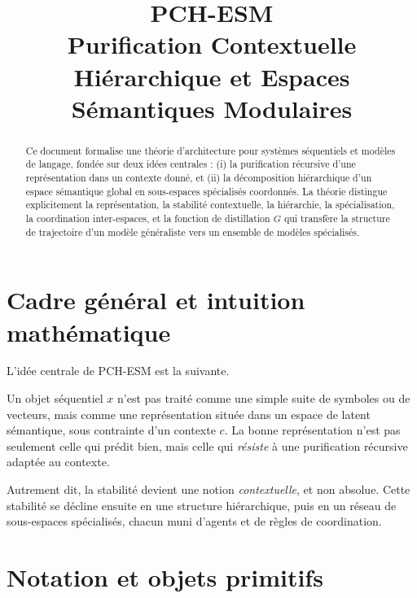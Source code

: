 \documentclass[11pt,a4paper]{article}
\title{PCH-ESM\\
\large Purification Contextuelle Hiérarchique et Espaces Sémantiques Modulaires}
\author{}
\date{}
\newcommand{\1}{\mathbf 1}
\begin{document}
\maketitle

\begin{abstract}
Ce document formalise une théorie d'architecture pour systèmes séquentiels et modèles de langage, fondée sur deux idées centrales :
(i) la purification récursive d'une représentation dans un contexte donné, et
(ii) la décomposition hiérarchique d'un espace sémantique global en sous-espaces spécialisés coordonnés.
La théorie distingue explicitement la représentation, la stabilité contextuelle, la hiérarchie, la spécialisation, la coordination inter-espaces, et la fonction de distillation \(G\) qui transfère la structure de trajectoire d'un modèle généraliste vers un ensemble de modèles spécialisés.
\end{abstract}

\tableofcontents

\section{Cadre général et intuition mathématique}

L'idée centrale de PCH-ESM est la suivante.

Un objet séquentiel \(x\) n'est pas traité comme une simple suite de symboles ou de vecteurs, mais comme une représentation située dans un espace de latent sémantique, sous contrainte d'un contexte \(c\). La bonne représentation n'est pas seulement celle qui prédit bien, mais celle qui \emph{résiste} à une purification récursive adaptée au contexte.

Autrement dit, la stabilité devient une notion \emph{contextuelle}, et non absolue. Cette stabilité se décline ensuite en une structure hiérarchique, puis en un réseau de sous-espaces spécialisés, chacun muni d'agents et de règles de coordination.

\section{Notation et objets primitifs}
\end{document}
